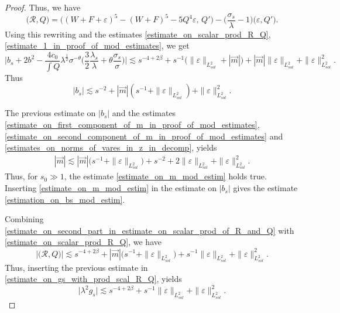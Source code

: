 \documentclass[16pt,english, oneside,reqno]{smfart}
\newcommand{\vare}{{\varepsilon}}
\begin{document}
\begin{proof}
    Thus, we have
    \begin{equation}
        \big(\mathcal{R}, Q \big) = \big( (W+F+\vare)^5 - (W+F)^5 - 5Q^4\vare,
        \, Q' \big) - \Big( \frac{\sigma_s}{\lambda} -1\Big)\big( \vare, Q' \big).
    \end{equation}
    Using this rewriting and the estimates \eqref{estimate_on_scalar_prod_R_Q}, \eqref{estimate_1_in_proof_of_mod_estimates}, we get
    \begin{equation}\label{estimate_on_second_part_in_estimate_on_scalar_prod_of_R_and_Q}
        \bigg\lvert b_s+2b^2 - \frac{4c_0}{\int Q}\lambda^{\frac{1}{2}}\sigma^{-\theta}\Big( \frac{3}{2}\frac{\lambda_s}{\lambda} + \theta \frac{\sigma_s}{\sigma}\Big) \bigg\rvert \lesssim s^{-4+2\beta}+  s^{-1}\big( \|\vare\|_{L^2_{sol}}+|\vec{m}| \big) + |\vec{m}|\|\vare\|_{L^2_{sol}}+\|\vare\|^2_{L^2_{sol}}.
    \end{equation}
    Thus
    \begin{equation}
        |b_s| \lesssim s^{-2} + |\vec{m}|(s^{-1} + \| \vare\|_{L^2_{sol}}) + \|\vare \|^2_{L^2_{sol}}.
    \end{equation}

    The previous estimate on $|b_s|$ and the estimates \eqref{estimate_on_first_component_of_m_in_proof_of_mod_estimates}, \eqref{estimate_on_second_component_of_m_in_proof_of_mod_estimates} and \eqref{estimates_on_norms_of_vares_in_z_in_decomp}, yields
    \begin{equation}
        \begin{split}
            |\vec{m}| \lesssim |\vec{m}|\big( s^{-1} + \|\vare \|_{L^2_{sol}} \big) + s^{-2} + 2\| \vare\|_{L^2_{sol}} + \|\vare \|^2_{L^2_{sol}}.
        \end{split}
    \end{equation}
    Thus, for $s_0 \gg1$, the estimate \eqref{estimate_on_m_mod_estim} holds true.
    Inserting \eqref{estimate_on_m_mod_estim} in the estimate on $|b_s|$ gives the estimate \eqref{estimation_on_bs_mod_estim}. 

    Combining \eqref{estimate_on_second_part_in_estimate_on_scalar_prod_of_R_and_Q} with \eqref{estimate_on_scalar_prod_R_Q}, we have
    \begin{equation}
        \big|\big( \mathcal{R},Q \big)\big| \lesssim s^{-4+2\beta} + |\vec{m}|\big( s^{-1}+\|\vare\|_{L^2_{sol}} \big) + s^{-1}\|\vare\|_{L^2_{sol}} + \|\vare\|^2_{L^2_{sol}}.
    \end{equation}
    Thus, inserting the previous estimate in \eqref{estimate_on_gs_with_prod_scal_R_Q}, yields
    \begin{equation}
       \lvert \lambda^2 g_s \rvert \lesssim s^{-4+2\beta} + s^{-1}\|\vare\|_{L^2_{sol}} + \|\vare\|^2_{L^2_{sol}}.
    \end{equation}
    
\end{proof}
\end{document}
